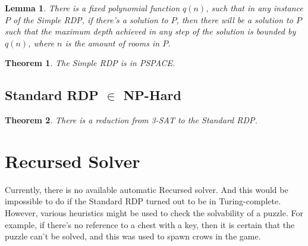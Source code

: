 \documentclass[a4paper]{article}
\newtheorem{theorem}{Theorem}[section]
\newtheorem{lemma}{Lemma}[section]
\theoremstyle{definition}
\begin{document}
\begin{lemma}
There is a fixed polynomial function $q(n)$, such that in any instance $P$ of the Simple RDP, if there's a solution to $P$,
then there will be a solution to $P$ such that the maximum depth achieved in any step of the solution is bounded by $q(n)$,
where $n$ is the amount of rooms in $P$.
\end{lemma}

\begin{theorem}
The Simple RDP is in PSPACE.
\end{theorem}

\subsection{Standard RDP $\in$ NP-Hard}
\begin{theorem}
There is a reduction from 3-SAT to the Standard RDP.
\end{theorem}

\section{Recursed Solver}
Currently, there is no available automatic Recursed solver. And this would be impossible to do if the Standard RDP turned out to be in Turing-complete.
However, various heuristics might be used to check the solvability of a puzzle. For example, if there's no reference
to a chest with a key, then it is certain that the puzzle can't be solved, and this was used to spawn crows in the game.
\end{document}
